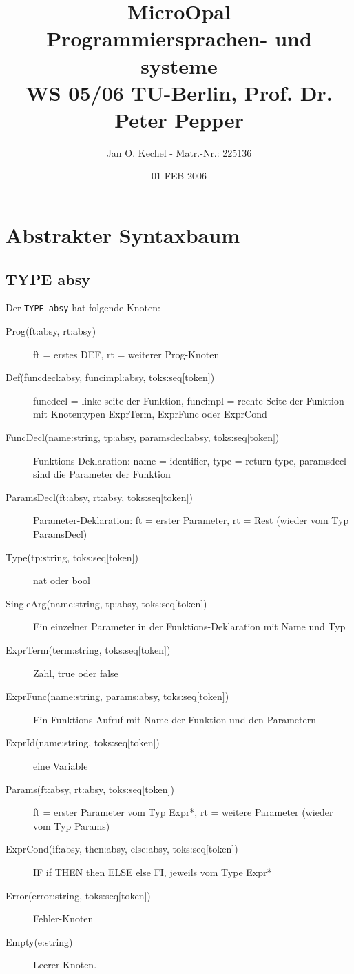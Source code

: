 \documentclass[a4paper,12pt]{report}
\begin{document}
%
\title{MicroOpal\\Programmiersprachen- und systeme\\WS 05/06 TU-Berlin,  Prof. Dr. Peter Pepper}
\author{Jan O. Kechel - Matr.-Nr.: 225136}
\date{01-FEB-2006}
%
\maketitle%
%
\tableofcontents
%
\newpage
{}
\chapter{Abstrakter Syntaxbaum}
\section{TYPE absy}
Der \texttt{TYPE absy} hat folgende Knoten:
\begin{description}
\item[Prog(ft:absy, rt:absy)] ft = erstes DEF, rt = weiterer Prog-Knoten
\item[Def(funcdecl:absy, funcimpl:absy, toks:seq$\lbrack$token$\rbrack$)] funcdecl = linke seite der Funktion, funcimpl = rechte Seite der Funktion mit Knotentypen ExprTerm, ExprFunc oder ExprCond
\item[FuncDecl(name:string, tp:absy, paramsdecl:absy, toks:seq$\lbrack$token$\rbrack$)] Funktions-Deklaration: name = identifier, type = return-type, paramsdecl sind die Parameter der Funktion
\item[ParamsDecl(ft:absy, rt:absy, toks:seq$\lbrack$token$\rbrack$)] Parameter-Deklaration: ft = erster Parameter, rt = Rest (wieder vom Typ ParamsDecl)
\item[Type(tp:string, toks:seq$\lbrack$token$\rbrack$)] nat oder bool
\item[SingleArg(name:string, tp:absy, toks:seq$\lbrack$token$\rbrack$)] Ein einzelner Parameter in der Funktions-Deklaration mit Name und Typ
\item[ExprTerm(term:string, toks:seq$\lbrack$token$\rbrack$)] Zahl, true oder false
\item[ExprFunc(name:string, params:absy, toks:seq$\lbrack$token$\rbrack$)] Ein Funktions-Aufruf mit Name der Funktion und den Parametern
\item[ExprId(name:string, toks:seq$\lbrack$token$\rbrack$)] eine Variable
\item[Params(ft:absy, rt:absy, toks:seq$\lbrack$token$\rbrack$)] ft = erster Parameter vom Typ Expr*, rt = weitere Parameter (wieder vom Typ Params)
\item[ExprCond(if:absy, then:absy, else:absy, toks:seq$\lbrack$token$\rbrack$)]IF if THEN then ELSE else FI, jeweils vom Type Expr*
\item[Error(error:string, toks:seq$\lbrack$token$\rbrack$)] Fehler-Knoten
\item[Empty(e:string)] Leerer Knoten.
\end{description}
\end{document}
